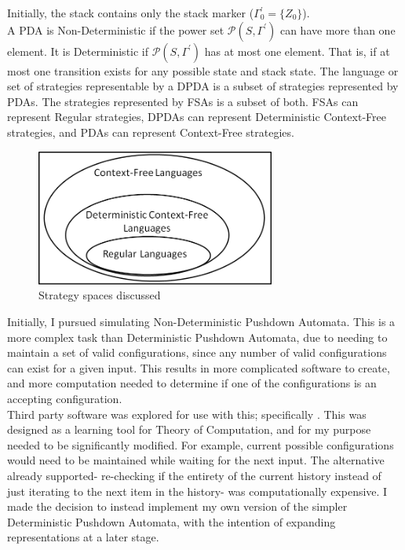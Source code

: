\documentclass[a4paper,11pt,bcshonoursthesis,singlespace,twoside,thesisdraft,pdflatex]{cssethesis}
\begin{document}
Initially, the stack contains only the stack marker ($\Gamma^\prime_0=\{Z_0\}$).\\

A PDA is Non-Deterministic if the power set $\mathcal P(S,\Gamma^\prime)$ can have more than one element. It is Deterministic if $\mathcal P(S,\Gamma^\prime)$ has at most one element. That is, if at most one transition exists for any possible state and stack state. The language or set of strategies representable by a DPDA is a subset of strategies represented by PDAs. The strategies represented by FSAs is a subset of both. FSAs can represent Regular strategies, DPDAs can represent Deterministic Context-Free strategies, and PDAs can represent Context-Free strategies.

\begin{figure}[h]
\centering
\includegraphics[width=0.7\textwidth]{languages}
\caption{Strategy spaces discussed}
\label{fig:languages}
\end{figure}

Initially, I pursued simulating Non-Deterministic Pushdown Automata. 
This is a more complex task than Deterministic Pushdown Automata, due to needing to maintain a set of valid configurations, since any number of valid configurations can exist for a given input. 
This results in more complicated software to create, and more computation needed to determine if one of the configurations is an accepting configuration. \\

Third party software was explored for use with this; specifically \citet{JFLAP}. 
This was designed as a learning tool for Theory of Computation, and for my purpose needed to be significantly modified. For example, current possible configurations would need to be maintained while waiting for the next input. The alternative already supported- re-checking if the entirety of the current history instead of just iterating to the next item in the history- was computationally expensive.  I made the decision to instead implement my own version of the simpler Deterministic Pushdown Automata, with the intention of expanding representations at a later stage.
\end{document}

